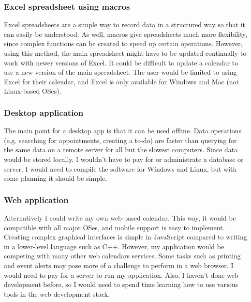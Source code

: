 \subsubsection{Excel spreadsheet using macros}

Excel spreadsheets are a simple way to record data in a structured way so that
it can easily be understood. As well, macros give spreadsheets much more
flexibility, since complex functions can be created to speed up certain
operations. However, using this method, the main spreadsheet might have to be
updated continually to work with newer versions of Excel. It could be difficult
to update a calendar to use a new version of the main spreadsheet. The user
would be limited to using Excel for their calendar, and Excel is only available
for Windows and Mac (not Linux-based OSes).


\subsubsection{Desktop application}

The main point for a desktop app is that it can be used offline. Data operations
(e.g. searching for appointments, creating a to-do) are faster than querying for
the same data on a remote server for all but the slowest computers. Since data
would be stored locally, I wouldn't have to pay for or administrate a database
or server. I would need to compile the software for Windows and Linux, but with
some planning it should be simple.


\subsubsection{Web application}

Alternatively I could write my own web-based calendar. This way, it would be
compatible with all major OSes, and mobile support is easy to implement.
Creating complex graphical interfaces is simple in JavaScript compared to
writing in a lower-level language such as C++. However, my application would be
competing with many other web calendars services. Some tasks such as printing
and event alerts may pose more of a challenge to perform in a web browser. I
would need to pay for a server to run my application. Also, I haven't done web
development before, so I would need to spend time learning how to use various
tools in the web development stack.


\newcommand{\solreq}[1]{\textbf{#1}&}
\newcommand{\solreqlast}[1]{\textbf{#1} \\}
\newcommand{\solname}[1]{\textbf{#1}&}
\newcommand{\solY}{\multicolumn{1}{c|}{Yes}}
\newcommand{\solN}{\multicolumn{1}{c|}{No}}

